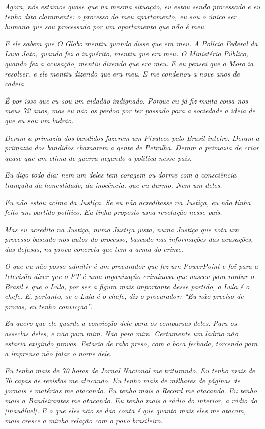 \emph{Agora, nós estamos quase que na mesma situação, eu estou sendo
processado e eu tenho dito claramente: o processo do meu apartamento, eu
sou o único ser humano que sou processado por um apartamento que não é
meu.}

\emph{E ele sabem que O Globo mentiu quando disse que era meu. A Polícia
Federal da Lava Jato, quando fez o inquérito, mentiu que era meu. O
Ministério Público, quando fez a acusação, mentiu dizendo que era meu. E
eu pensei que o Moro ia resolver, e ele mentiu dizendo que era meu. E me
condenou a nove anos de cadeia.}

\emph{É por isso que eu sou um cidadão indignado. Porque eu já fiz muita
coisa nos meus 72 anos, mas eu não os perdoo por ter passado para a
sociedade a ideia de que eu sou um ladrão.}

\emph{Deram a primazia dos bandidos fazerem um Pixuleco pelo Brasil
inteiro. Deram a primazia dos bandidos chamarem a gente de Petralha.
Deram a primazia de criar quase que um clima de guerra negando a
política nesse país.}

\emph{Eu digo todo dia: nem um deles tem coragem ou dorme com a
consciência tranquila da honestidade, da inocência, que eu durmo. Nem um
deles.}

\emph{Eu não estou acima da Justiça. Se eu não acreditasse na Justiça,
eu não tinha feito um partido político. Eu tinha proposto uma revolução
nesse país.}

\emph{Mas eu acredito na Justiça, numa Justiça justa, numa Justiça que
vota um processo baseado nos autos do processo, baseado nas informações
das acusações, das defesas, na prova concreta que tem a arma do crime.}

\emph{O que eu não posso admitir é um procurador que fez um PowerPoint e
foi para a televisão dizer que o PT é uma organização criminosa que
nasceu para roubar o Brasil e que o Lula, por ser a figura mais
importante desse partido, o Lula é o chefe. E, portanto, se o Lula é o
chefe, diz o procurador: ``Eu não preciso de provas, eu tenho
convicção''.}

\emph{Eu quero que ele guarde a convicção dele para os comparsas deles.
Para os asseclas deles, e não para mim. Não para mim. Certamente um
ladrão não estaria exigindo provas. Estaria de rabo preso, com a boca
fechada, torcendo para a imprensa não falar o nome dele.}

\emph{Eu tenho mais de 70 horas de Jornal Nacional me triturando. Eu
tenho mais de 70 capas de revistas me atacando. Eu tenho mais de
milhares de páginas de jornais e matérias me atacando. Eu tenho mais a
Record me atacando. Eu tenho mais a Bandeirantes me atacando. Eu tenho
mais a rádio do interior, a rádio do {[}inaudível{]}. E o que eles não
se dão conta é que quanto mais eles me atacam, mais cresce a minha
relação com o povo brasileiro.~}

